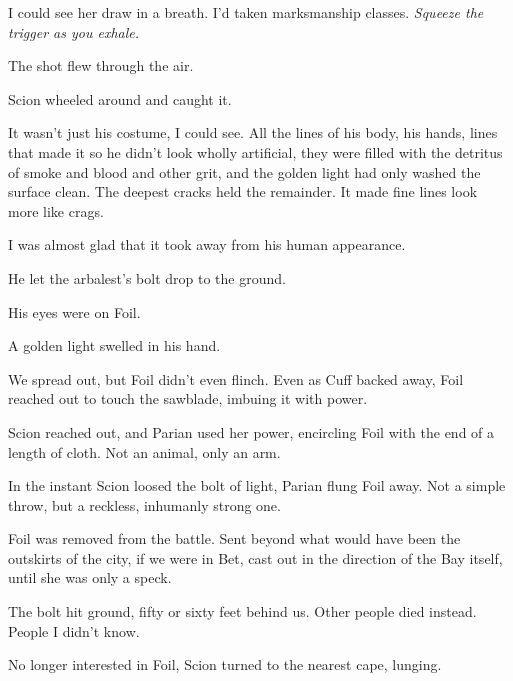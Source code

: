 I could see her draw in a breath.  I'd taken marksmanship classes.  \emph{Squeeze the trigger as you exhale.}



The shot flew through the air.



Scion wheeled around and caught it.



It wasn't just his costume, I could see.  All the lines of his body, his hands, lines that made it so he didn't look wholly artificial, they were filled with the detritus of smoke and blood and other grit, and the golden light had only washed the surface clean.  The deepest cracks held the remainder.  It made fine lines look more like crags.



I was almost glad that it took away from his human appearance.



He let the arbalest's bolt drop to the ground.



His eyes were on Foil.



A golden light swelled in his hand.



We spread out, but Foil didn't even flinch.  Even as Cuff backed away, Foil reached out to touch the sawblade, imbuing it with power.



Scion reached out, and Parian used her power, encircling Foil with the end of a length of cloth.  Not an animal, only an arm.



In the instant Scion loosed the bolt of light, Parian flung Foil away.  Not a simple throw, but a reckless, inhumanly strong one.



Foil was removed from the battle.  Sent beyond what would have been the outskirts of the city, if we were in Bet, cast out in the direction of the Bay itself, until she was only a speck.



The bolt hit ground, fifty or sixty feet behind us.  Other people died instead.  People I didn't know.



No longer interested in Foil, Scion turned to the nearest cape, lunging.



